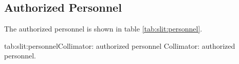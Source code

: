 \begin{safetyen}{10}{15}
\subsection{Authorized  Personnel} 
\end{safetyen}
The authorized personnel is shown in table \ref{tab:slit:personnel}.
\begin{namestab}{tab:slit:personnel}{Collimator: authorized personnel}{%
      Collimator: authorized personnel.}
\end{namestab}

